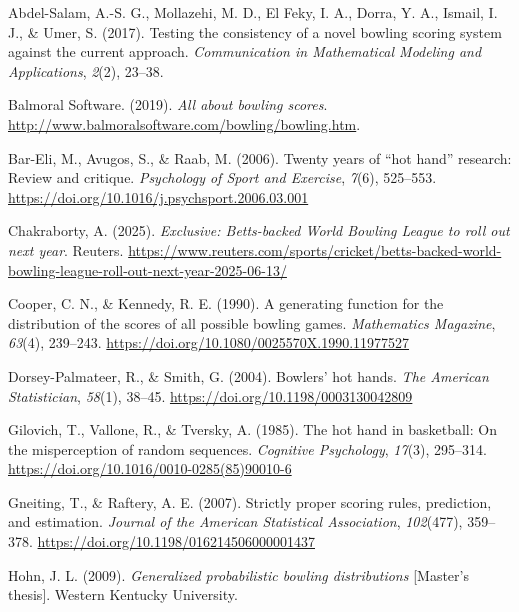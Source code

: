 \documentclass[
  letterpaper,
  DIV=11,
  numbers=noendperiod]{scrartcl}
\newlength{\cslhangindent}
\newenvironment{CSLReferences}[2] %
 {\begin{list}{}{%
  \setlength{\itemindent}{0pt}
  \setlength{\leftmargin}{0pt}
  \setlength{\parsep}{0pt}
  \ifodd #1
   \setlength{\leftmargin}{\cslhangindent}
   \setlength{\itemindent}{-1\cslhangindent}
  \fi
  \setlength{\itemsep}{#2\baselineskip}}}
 {\end{list}}
\begin{document}
\protect{}\label{refs}
\begin{CSLReferences}{1}{0}
Abdel-Salam, A.-S. G., Mollazehi, M. D., El Feky, I. A., Dorra, Y. A.,
Ismail, I. J., \& Umer, S. (2017). Testing the consistency of a novel
bowling scoring system against the current approach. \emph{Communication
in Mathematical Modeling and Applications}, \emph{2}(2), 23--38.

Balmoral Software. (2019). \emph{All about bowling scores}.
\url{http://www.balmoralsoftware.com/bowling/bowling.htm}.

Bar-Eli, M., Avugos, S., \& Raab, M. (2006). Twenty years of {``hot
hand''} research: Review and critique. \emph{Psychology of Sport and
Exercise}, \emph{7}(6), 525--553.
\url{https://doi.org/10.1016/j.psychsport.2006.03.001}

Chakraborty, A. (2025). \emph{Exclusive: {Betts}-backed {World Bowling
League} to roll out next year}. Reuters.
\url{https://www.reuters.com/sports/cricket/betts-backed-world-bowling-league-roll-out-next-year-2025-06-13/}

Cooper, C. N., \& Kennedy, R. E. (1990). A generating function for the
distribution of the scores of all possible bowling games.
\emph{Mathematics Magazine}, \emph{63}(4), 239--243.
\url{https://doi.org/10.1080/0025570X.1990.11977527}

Dorsey-Palmateer, R., \& Smith, G. (2004). Bowlers' hot hands. \emph{The
American Statistician}, \emph{58}(1), 38--45.
\url{https://doi.org/10.1198/0003130042809}

Gilovich, T., Vallone, R., \& Tversky, A. (1985). The hot hand in
basketball: On the misperception of random sequences. \emph{Cognitive
Psychology}, \emph{17}(3), 295--314.
\url{https://doi.org/10.1016/0010-0285(85)90010-6}

Gneiting, T., \& Raftery, A. E. (2007). Strictly proper scoring rules,
prediction, and estimation. \emph{Journal of the American Statistical
Association}, \emph{102}(477), 359--378.
\url{https://doi.org/10.1198/016214506000001437}

Hohn, J. L. (2009). \emph{Generalized probabilistic bowling
distributions} {[}Master's thesis{]}. Western Kentucky University.


\end{CSLReferences}
\end{document}
